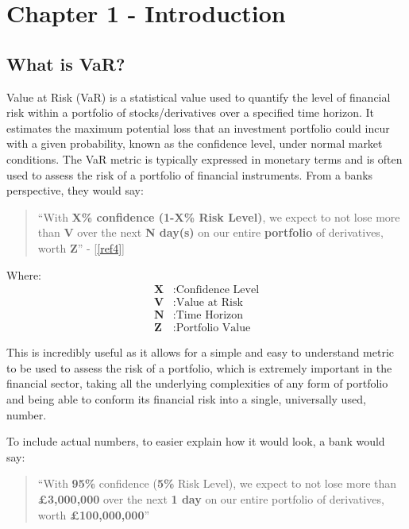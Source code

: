 \documentclass{article}
\begin{document}

\newpage
\section{Chapter 1 - Introduction}

\subsection{What is VaR?}

Value at Risk (VaR) is a statistical value used to quantify the level of financial risk within a portfolio of stocks/derivatives over a specified time horizon. It estimates the maximum potential loss that an investment portfolio could incur with a given probability, known as the confidence level, under normal market conditions. The VaR metric is typically expressed in monetary terms and is often used to assess the risk of a portfolio of financial instruments. From a banks perspective, they would say:
\begin{quote}
  ``With \textbf{X\% confidence (1-X\% Risk Level)}, we expect to not lose more than \textbf{V} over the next \textbf{N day(s)} on our entire \textbf{portfolio} of derivatives, worth \textbf{Z}'' - [\ref{ref4}]

\end{quote}

Where:
\begin{align*}
  \textbf{X} & : \text{Confidence Level} \\
  \textbf{V} & : \text{Value at Risk} \\
  \textbf{N} & : \text{Time Horizon} \\
  \textbf{Z} & : \text{Portfolio Value}
\end{align*}

This is incredibly useful as it allows for a simple and easy to understand metric to be used to assess the risk of a portfolio, which is extremely important in the financial sector, taking all the underlying complexities of any form of portfolio and being able to conform its financial risk into a single, universally used, number. \\\vspace{0.3cm}

To include actual numbers, to easier explain how it would look, a bank would say:
\begin{quote}
  ``With \textbf{95\%} confidence (\textbf{5\%} Risk Level), we expect to not lose more than \textbf{£3,000,000} over the next \textbf{1 day} on our entire portfolio of derivatives, worth \textbf{£100,000,000}''
\end{quote}
\end{document}

